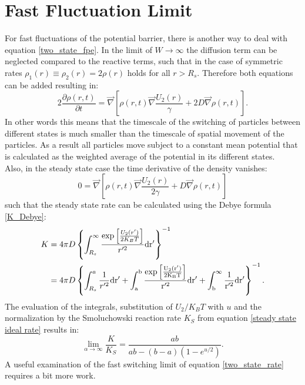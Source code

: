 \section{Fast Fluctuation Limit}
\label{lim_short_rd}
For fast fluctuations of the potential barrier, there is another way to deal with equation \eqref{two_state_fpe}. In the limit of $W \rightarrow \infty$ the diffusion term can be neglected compared to the reactive terms, such that in the case of symmetric rates $\rho_1(r) \equiv \rho_2(r) = 2\rho(r)$ holds for all $r>R_s$. Therefore both equations can be added resulting in: 
\begin{equation}
    2 \frac{\partial \rho(r,t)}{\partial t} = \vec \nabla \left[\rho(r,t) \vec \nabla \frac{U_2(r)}{\gamma} + 2 D \vec \nabla \rho(r,t) \right].
    \label{fast_limit_fpe}
\end{equation} 
In other words this means that the timescale of the switching of particles between different states is much smaller than the timescale of spatial movement of the particles. As a result all particles move subject to a constant mean potential that is calculated as the weighted average of the potential in its different states. \\
Also, in the steady state case the time derivative of the density vanishes:
\begin{equation}
    0 = \vec \nabla \left[\rho(r,t) \vec \nabla \frac{U_2(r)}{2\gamma} + D \vec \nabla \rho(r,t) \right]
\end{equation}
such that the steady state rate can be calculated using the Debye formula \eqref{K_Debye}:
\begin{align}
    K &=  4 \pi D \left\{\int_{R_s}^{\infty} \frac{\exp \left[ \frac{U_2(r')}{2 K_B T}\right]}{r'^2} \rm d r' \right\}^{-1} \nonumber \\
    &= 4 \pi D \left\{\int_{R_s}^{a} \frac{1}{r'^2} \rm d r' + \int_{a}^{b} \frac{\exp \left[ \frac{U_2(r')}{2K_B T}\right]}{r'^2} \rm d r' + \int_{b}^{\infty} \frac{1}{r'^2} \rm d r' \right\}^{-1}.
    \label{mean_potential_rate}
\end{align}
The evaluation of the integrals, substitution of $U_2/K_B T$ with $u$ and the normalization by the Smoluchowski reaction rate $K_S$ from equation \eqref{steady state ideal rate} results in:
\begin{equation}
    \lim_{\alpha \rightarrow \infty} \frac{K}{K_S} = \frac{ab}{ab - (b-a)(1-e^{u/2})}.
    \label{K_fast_limit_1}
\end{equation}
A useful examination of the fast switching limit of equation \eqref{two_state_rate} requires a bit more work.
